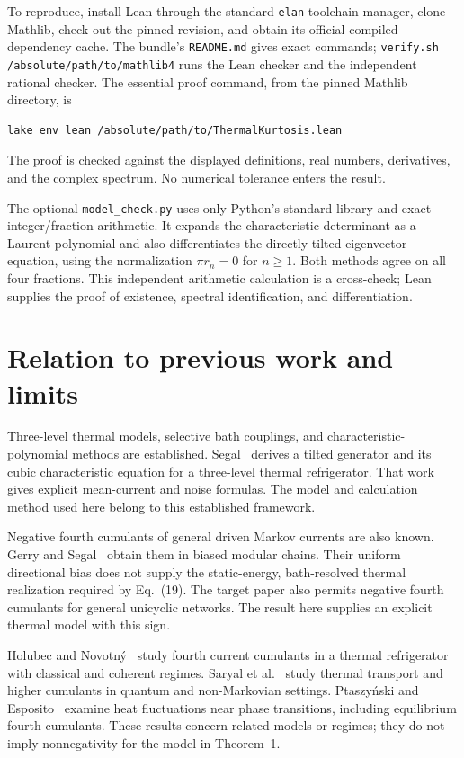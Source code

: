 \documentclass[11pt,a4paper]{article}
\begin{document}
To reproduce, install Lean through the standard \texttt{elan} toolchain manager, clone Mathlib, check out the pinned revision, and obtain its official compiled dependency cache. The bundle's \texttt{README.md} gives exact commands; \texttt{verify.sh /absolute/path/to/mathlib4} runs the Lean checker and the independent rational checker. The essential proof command, from the pinned Mathlib directory, is
\begin{verbatim}
lake env lean /absolute/path/to/ThermalKurtosis.lean
\end{verbatim}
The proof is checked against the displayed definitions, real numbers, derivatives, and the complex spectrum. No numerical tolerance enters the result.

The optional \texttt{model\_check.py} uses only Python's standard library and exact integer/fraction arithmetic. It expands the characteristic determinant as a Laurent polynomial and also differentiates the directly tilted eigenvector equation, using the normalization $\pi r_n=0$ for $n\geq1$. Both methods agree on all four fractions. This independent arithmetic calculation is a cross-check; Lean supplies the proof of existence, spectral identification, and differentiation.

\section{Relation to previous work and limits}
Three-level thermal models, selective bath couplings, and characteristic-polynomial methods are established. Segal~\cite{segal2018} derives a tilted generator and its cubic characteristic equation for a three-level thermal refrigerator. That work gives explicit mean-current and noise formulas. The model and calculation method used here belong to this established framework.

Negative fourth cumulants of general driven Markov currents are also known. Gerry and Segal~\cite{gerry2023} obtain them in biased modular chains. Their uniform directional bias does not supply the static-energy, bath-resolved thermal realization required by Eq.~(19). The target paper also permits negative fourth cumulants for general unicyclic networks. The result here supplies an explicit thermal model with this sign.

Holubec and Novotn\'y~\cite{holubec2019} study fourth current cumulants in a thermal refrigerator with classical and coherent regimes. Saryal et al.~\cite{saryal2019} study thermal transport and higher cumulants in quantum and non-Markovian settings. Ptaszy\'nski and Esposito~\cite{ptaszynski2025} examine heat fluctuations near phase transitions, including equilibrium fourth cumulants. These results concern related models or regimes; they do not imply nonnegativity for the model in Theorem~1.
\end{document}
